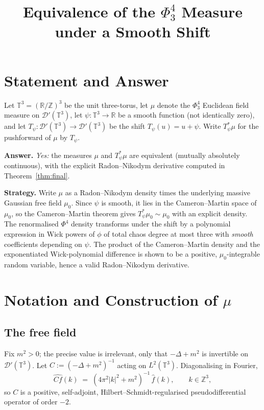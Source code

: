 \documentclass[12pt]{article}
\title{Equivalence of the $\Phi^4_3$ Measure under a Smooth Shift}
\author{}
\date{}
\theoremstyle{definition}
\begin{document}
\maketitle

\section*{Statement and Answer}

Let $\mathbb{T}^3 = (\mathbb{R}/\mathbb{Z})^3$ be the unit three-torus, let $\mu$ denote the
$\Phi^4_3$ Euclidean field measure on $\mathcal{D}'(\mathbb{T}^3)$, let
$\psi:\mathbb{T}^3\to\mathbb{R}$ be a smooth function (not identically zero), and let
$T_\psi:\mathcal{D}'(\mathbb{T}^3)\to\mathcal{D}'(\mathbb{T}^3)$ be the shift
$T_\psi(u)=u+\psi$. Write $T_\psi^*\mu$ for the pushforward of $\mu$ by $T_\psi$.

\medskip

\noindent\textbf{Answer.} \emph{Yes:} the measures $\mu$ and $T_\psi^*\mu$ are equivalent
(mutually absolutely continuous), with the explicit Radon--Nikodym derivative computed in
Theorem~\ref{thm:final}.

\medskip

\noindent\textbf{Strategy.} Write $\mu$ as a Radon--Nikodym density times the underlying
massive Gaussian free field $\mu_0$. Since $\psi$ is smooth, it lies in the Cameron--Martin
space of $\mu_0$, so the Cameron--Martin theorem gives $T_\psi^*\mu_0\sim\mu_0$ with an
explicit density. The renormalised $\Phi^4$ density transforms under the shift by a
polynomial expression in Wick powers of $\phi$ of total chaos degree at most three with
\emph{smooth} coefficients depending on $\psi$. The product of the Cameron--Martin density
and the exponentiated Wick-polynomial difference is shown to be a positive,
$\mu_0$-integrable random variable, hence a valid Radon--Nikodym derivative.

\section{Notation and Construction of $\mu$}

\subsection{The free field}

Fix $m^2>0$; the precise value is irrelevant, only that $-\Delta+m^2$ is invertible on
$\mathcal{D}'(\mathbb{T}^3)$. Let $C := (-\Delta+m^2)^{-1}$ acting on $L^2(\mathbb{T}^3)$.
Diagonalising in Fourier,
\begin{equation}\label{eq:FourierC}
\widehat{Cf}(k) \;=\; (4\pi^2|k|^2+m^2)^{-1}\,\widehat{f}(k),\qquad k\in\mathbb{Z}^3,
\end{equation}
so $C$ is a positive, self-adjoint, Hilbert--Schmidt-regularised pseudodifferential
operator of order $-2$.
\end{document}
